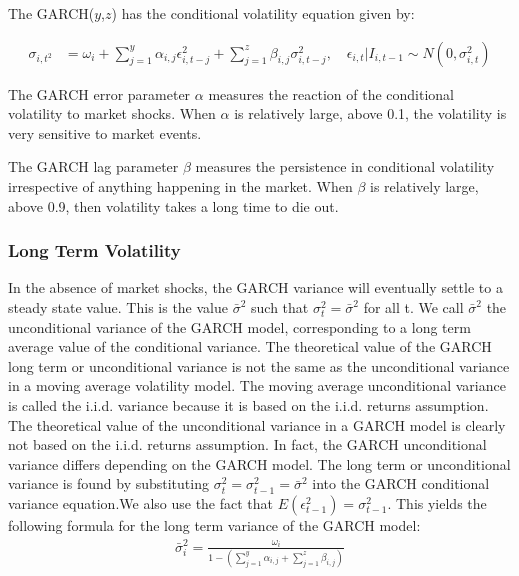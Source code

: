 The GARCH($y$,$z$) has the conditional volatility equation given by:

\begin{align}
    \sigma_{i,t^2} &= \omega_i + \sum_{j=1}^y\alpha_{i,j}\epsilon_{i,t-j}^2+\sum_{j=1}^z\beta_{i,j}\sigma_{i,t-j}^2,\quad\epsilon_{i,t} | I_{i,t-1} \sim N(0,{\sigma_{i,t}^2}) \label{ConditionalVolatilityEquation}
\end{align}

The GARCH error parameter $\alpha$ measures the reaction of the conditional volatility to market shocks. When $\alpha$ is relatively large, above 0.1, the volatility is very sensitive to market events.

The GARCH lag parameter $\beta$ measures the persistence in conditional volatility irrespective of anything happening in the market. When $\beta$ is relatively large, above 0.9, then volatility takes a long time to die out.

\subsubsection{Long Term Volatility}

In the absence of market shocks, the GARCH variance will eventually settle to a steady state value. This is the value $\bar{\sigma}^2$ such that ${\sigma_t^2} = \bar{\sigma}^2$ for all t. We call $\bar{\sigma}^2$ the unconditional variance of the GARCH model, corresponding to a long term average value of the conditional variance. The theoretical value of the GARCH long term or unconditional variance is not the same as the unconditional variance in a moving average volatility model. The moving average unconditional variance is called the i.i.d. variance because it is based on the i.i.d. returns assumption. The theoretical value of the unconditional variance in a GARCH model is clearly not based on the i.i.d. returns assumption. In fact, the GARCH unconditional variance differs depending on the GARCH model. The long term or unconditional variance is found by substituting ${\sigma_t^2} = {\sigma_{t-1}^2} = \bar{\sigma}^2$ into the GARCH conditional variance equation.We also use the fact that $E(\epsilon_{t-1}^2)=\sigma_{t-1}^2$. This yields the following formula for the long term variance of the GARCH model:
\begin{align}
    \bar{\sigma}_i^2=\frac{\omega_i}{1-(\sum_{j=1}^y\alpha_{i,j}+\sum_{j=1}^z\beta_{i,j})} \label{longTermVolatilityGARCH}
\end{align}

